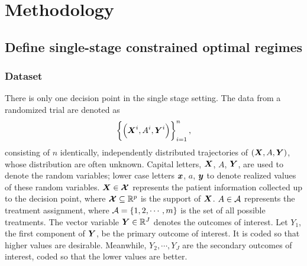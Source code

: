  \section{Methodology}
\subsection{Define single-stage constrained optimal regimes}
\subsubsection{Dataset} 
There is only one decision point in the single stage setting. The data from a randomized trial are denoted as
$$\left\{\left(\boldsymbol{X}^i, A^i, \boldsymbol{Y}^i\right)\right\}_{i=1}^n,$$ 
consisting of $n$  identically, independently distributed trajectories of $\left(\boldsymbol{X}, A, \boldsymbol{Y}\right)$, whose distribution are often unknown. Capital letters, $\boldsymbol{X}$, $A$, $\boldsymbol{Y}$, are used to denote the random variables; lower case letters $\boldsymbol{x}$, $a$, $\boldsymbol{y}$ to denote realized values of these random variables.  $\boldsymbol{X} \in \boldsymbol{\mathcal{X}}$ represents the patient information collected up to the decision point, where $\boldsymbol{\mathcal{X}} \subseteq \mathbb{R}^{p}$ is the support of $\boldsymbol{X}$. $A \in \mathcal{A}$ represents the treatment assignment, where $\mathcal{A} = \{1,2, \cdots, m\}$ is the set of all possible treatments. The vector variable $\boldsymbol{Y} \in \mathbb{R}^J$ denotes the outcomes of interest. Let $Y_1$, the first component of $\boldsymbol{Y}$, be the primary outcome of interest. It is coded so that higher values are desirable. Meanwhile, $Y_2, \cdots, Y_J$ are the secondary outcomes of interest, coded so that the lower values are better. 

